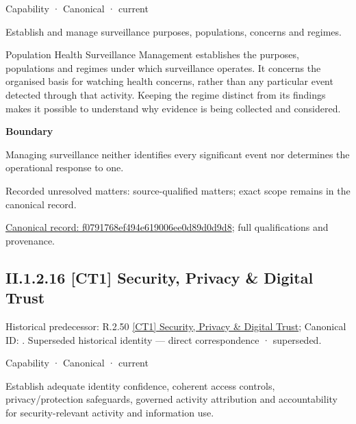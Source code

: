 \label{element:f0791768ef494e619006ee0d89d0d9d8}
{\small Capability · Canonical · current}\par

Establish and manage surveillance purposes, populations, concerns and regimes.



Population Health Surveillance Management establishes the purposes, populations and regimes under which surveillance operates. It concerns the organised basis for watching health concerns, rather than any particular event detected through that activity. Keeping the regime distinct from its findings makes it possible to understand why evidence is being collected and considered.



\textbf{Boundary}



Managing surveillance neither identifies every significant event nor determines the operational response to one.


{\small Recorded unresolved matters: source-qualified matters; exact scope remains in the canonical record.}\par
{\footnotesize \href{../../../../continuum/strategy/capability/f0791768ef494e619006ee0d89d0d9d8.md}{Canonical record: f0791768ef494e619006ee0d89d0d9d8}; full qualifications and provenance.}\par
\subsection*{II.1.2.16 [CT1] Security, Privacy \& Digital Trust}
\label{navigation:II.1.2.16}

{\small Historical predecessor: R.2.50 \hyperref[element:b01441b2f5584fc2b9c3988643a7c93b]{[CT1] Security, Privacy \& Digital Trust}; Canonical ID: \texttt{}. Superseded historical identity — direct correspondence · superseded.}\par
\label{element:71f0431fdfcd4f779e16d9e5ea609833}
{\small Capability · Canonical · current}\par

Establish adequate identity confidence, coherent access controls, privacy/protection safeguards, governed activity attribution and accountability for security-relevant activity and information use.



